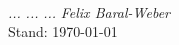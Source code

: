 \documentclass[a4paper, 12pt]{scrartcl}
\begin{document}
\begin{normalsize}

\raggedright\textbf{}\\	
		\begin{flushright}
		\textit{...}
		\textit{...}
		\textit{...}
		\textit{Felix Baral-Weber}\\
		Stand: \space \today \space \thistime
		\end{flushright}

\end{normalsize}


%
\end{document}
